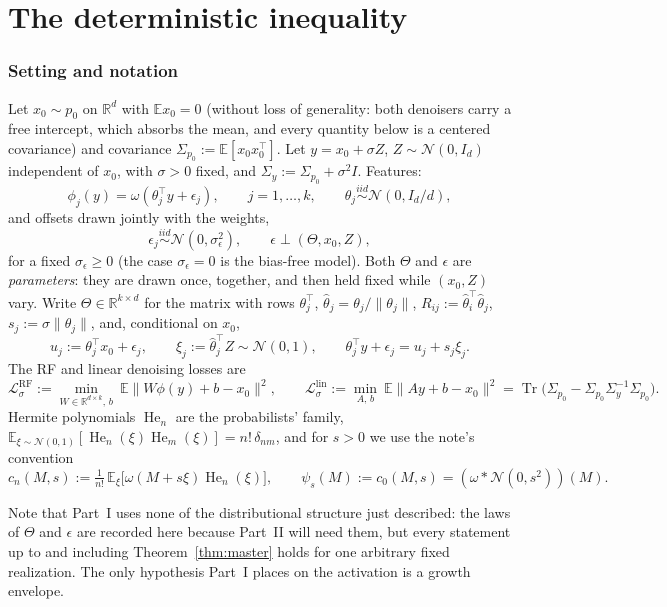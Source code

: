 \documentclass[11pt]{article}
\theoremstyle{remark}
\newcommand{\E}{\mathbb{E}}
\newcommand{\R}{\mathbb{R}}
\newcommand{\Tr}{\operatorname{Tr}}
\newcommand{\He}{\operatorname{He}}
\newcommand{\Sig}{\Sigma_{p_0}}
\newcommand{\Sy}{\Sigma_y}
\begin{document}
\part{The deterministic inequality}

\section{Setting and notation}\label{sec:setting}

Let $x_0 \sim p_0$ on $\R^d$ with $\E x_0 = 0$ (without loss of generality: both denoisers carry a free intercept, which absorbs the mean, and every quantity below is a centered covariance) and covariance $\Sig := \E[x_0 x_0^\top]$. Let $y = x_0 + \sigma Z$, $Z \sim \mathcal N(0, I_d)$ independent of $x_0$, with $\sigma > 0$ fixed, and $\Sy := \Sig + \sigma^2 I$. Features:
\[
\phi_j(y) = \omega(\theta_j^\top y + \epsilon_j), \qquad j = 1, \dots, k, \qquad \theta_j \overset{iid}{\sim} \mathcal N(0, I_d/d),
\]
and offsets drawn jointly with the weights,
\[
\epsilon_j \overset{iid}{\sim} \mathcal N(0, \sigma_\epsilon^2), \qquad \epsilon \perp (\Theta, x_0, Z),
\]
for a fixed $\sigma_\epsilon \ge 0$ (the case $\sigma_\epsilon = 0$ is the bias-free model). Both $\Theta$ and $\epsilon$ are \emph{parameters}: they are drawn once, together, and then held fixed while $(x_0, Z)$ vary. Write $\Theta \in \R^{k\times d}$ for the matrix with rows $\theta_j^\top$, $\hat\theta_j = \theta_j/\lVert\theta_j\rVert$, $R_{ij} := \hat\theta_i^\top\hat\theta_j$, $s_j := \sigma\lVert\theta_j\rVert$, and, conditional on $x_0$,
\[
u_j := \theta_j^\top x_0 + \epsilon_j, \qquad \xi_j := \hat\theta_j^\top Z \sim \mathcal N(0,1), \qquad \theta_j^\top y + \epsilon_j = u_j + s_j\xi_j .
\]
The RF and linear denoising losses are
\[
\mathcal L^{\mathrm{RF}}_\sigma := \min_{W \in \R^{d\times k},\, b}\ \E\lVert W\phi(y) + b - x_0\rVert^2,
\qquad
\mathcal L^{\mathrm{lin}}_\sigma := \min_{A,\, b}\ \E\lVert Ay + b - x_0\rVert^2 = \Tr\!\big(\Sig - \Sig\Sy^{-1}\Sig\big).
\]
Hermite polynomials $\He_n$ are the probabilists' family, $\E_{\xi\sim\mathcal N(0,1)}[\He_n(\xi)\He_m(\xi)] = n!\,\delta_{nm}$, and for $s > 0$ we use the note's convention
\[
c_n(M, s) := \tfrac{1}{n!}\,\E_{\xi}\big[\omega(M + s\xi)\He_n(\xi)\big],
\qquad
\psi_s(M) := c_0(M,s) = (\omega * \mathcal N(0,s^2))(M).
\]

\noindent Note that Part~I uses none of the distributional structure just described: the laws of $\Theta$ and $\epsilon$ are recorded here because Part~II will need them, but every statement up to and including Theorem~\ref{thm:master} holds for one arbitrary fixed realization. The only hypothesis Part~I places on the activation is a growth envelope.
\end{document}
